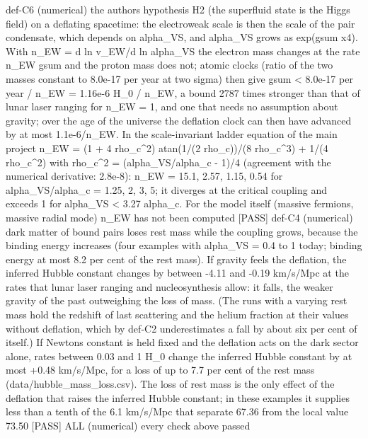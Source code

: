 \documentclass[
  10pt,
]{article}
\newenvironment{Shaded}{}{}
\newcommand{\NormalTok}[1]{#1}
\begin{document}
\begin{Shaded}
\begin{Highlighting}[]
\NormalTok{[PASS] def{-}C6  (numerical) the author\textquotesingle{}s hypothesis H2 (the superfluid state is the Higgs field) on a deflating spacetime: the electroweak scale is then the scale of the pair condensate, which depends on alpha\_VS, and alpha\_VS grows as exp(gsum x4). With n\_EW = d ln v\_EW/d ln alpha\_VS the electron mass changes at the rate n\_EW gsum and the proton mass does not; atomic clocks (ratio of the two masses constant to 8.0e{-}17 per year at two sigma) then give gsum \textless{} 8.0e{-}17 per year / n\_EW = 1.16e{-}6 H\_0 / n\_EW, a bound 2787 times stronger than that of lunar laser ranging for n\_EW = 1, and one that needs no assumption about gravity; over the age of the universe the deflation clock can then have advanced by at most 1.1e{-}6/n\_EW. In the scale{-}invariant ladder equation of the main project n\_EW = (1 + 4 rho\_c\^{}2) atan(1/(2 rho\_c))/(8 rho\_c\^{}3) + 1/(4 rho\_c\^{}2) with rho\_c\^{}2 = (alpha\_VS/alpha\_c {-} 1)/4 (agreement with the numerical derivative: 2.8e{-}8): n\_EW = 15.1, 2.57, 1.15, 0.54 for alpha\_VS/alpha\_c = 1.25, 2, 3, 5; it diverges at the critical coupling and exceeds 1 for alpha\_VS \textless{} 3.27 alpha\_c. For the model itself (massive fermions, massive radial mode) n\_EW has not been computed}
\NormalTok{[PASS] def{-}C4  (numerical) dark matter of bound pairs loses rest mass while the coupling grows, because the binding energy increases (four examples with alpha\_VS = 0.4 to 1 today; binding energy at most 8.2 per cent of the rest mass). If gravity feels the deflation, the inferred Hubble constant changes by between {-}4.11 and {-}0.19 km/s/Mpc at the rates that lunar laser ranging and nucleosynthesis allow: it falls, the weaker gravity of the past outweighing the loss of mass. (The runs with a varying rest mass hold the redshift of last scattering and the helium fraction at their values without deflation, which by def{-}C2 underestimates a fall by about six per cent of itself.) If Newton\textquotesingle{}s constant is held fixed and the deflation acts on the dark sector alone, rates between 0.03 and 1 H\_0 change the inferred Hubble constant by at most +0.48 km/s/Mpc, for a loss of up to 7.7 per cent of the rest mass (data/hubble\_mass\_loss.csv). The loss of rest mass is the only effect of the deflation that raises the inferred Hubble constant; in these examples it supplies less than a tenth of the 6.1 km/s/Mpc that separate 67.36 from the local value 73.50}
\NormalTok{[PASS] ALL  (numerical) every check above passed}
\end{Highlighting}
\end{Shaded}
\end{document}
